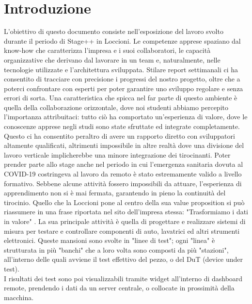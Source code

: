 \chapter{Introduzione}
\label{chap:intro}

L'obiettivo di questo documento consiste nell'esposizione del lavoro svolto durante il periodo di Stage++ in Loccioni. Le competenze apprese spaziano dal know-how che caratterizza l'impresa e i suoi collaboratori, le capacità organizzative che derivano dal lavorare in un team e, naturalmente, nelle tecnologie utilizzate e l'architettura sviluppata.
Stilare report settimanali ci ha consentito di tracciare con precisione i progressi del nostro progetto, oltre che a poterci confrontare con esperti per poter garantire uno sviluppo regolare e senza errori di sorta.
Una caratteristica che spicca nel far parte di questo ambiente è quella della collaborazione orizzontale, dove noi studenti abbiamo percepito l'importanza attribuitaci: tutto ciò ha comportato un'esperienza di valore, dove le conoscenze apprese negli studi sono state sfruttate ed integrate completamente.
Questo ci ha consentito peraltro di avere un rapporto diretto con sviluppatori altamente qualificati, altrimenti impossibile in altre realtà dove una divisione del lavoro verticale implicherebbe una minore integrazione dei tirocinanti.
Poter prender parte allo stage anche nel periodo in cui l'emergenza sanitaria dovuta al COVID-19 costringeva al lavoro da remoto è stato estremamente valido a livello formativo. Sebbene alcune attività fossero impossibili da attuare, l'esperienza di apprendimento non si è mai fermata, garantendo in pieno la continuità del tirocinio.
Quello che la Loccioni pone al centro della sua value proposition si può riassumere in una frase riportata nel sito dell'impresa stessa: "Trasformiamo i dati in valore" \cite{Loccioni}.
La sua principale attività è quella di progettare e realizzare sistemi di misura per 
testare e controllare componenti di auto, lavatrici ed altri strumenti elettronici.
Queste mansioni sono svolte in "linee di test"; ogni "linea" è strutturata in più "banchi" che a loro volta sono composti da più "stazioni", all'interno delle quali avviene 
il test effettivo del pezzo, o del DuT (device under test).\\
I risultati dei test sono poi visualizzabili tramite widget all'interno di dashboard remote, prendendo i dati da un server centrale, 
o collocate in prossimità della macchina.
